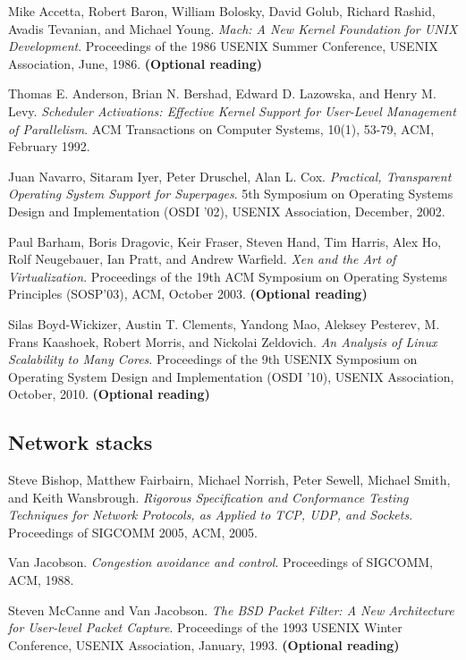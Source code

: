 \documentclass[a4paper,10pt]{article}
\begin{document}
Mike Accetta, Robert Baron, William Bolosky, David Golub, Richard Rashid,
Avadis Tevanian, and Michael Young. \textit{Mach: A New Kernel Foundation for
UNIX Development}.  Proceedings of the 1986 USENIX Summer Conference, USENIX
Association, June, 1986.  \textbf{(Optional reading)}

\medskip
\noindent
Thomas E. Anderson, Brian N. Bershad, Edward D. Lazowska, and Henry M. Levy.
\textit{Scheduler Activations: Effective Kernel Support for User-Level
Management of Parallelism}. ACM Transactions on Computer Systems, 10(1),
53-79, ACM, February 1992.

\medskip
\noindent
Juan Navarro, Sitaram Iyer, Peter Druschel, Alan L. Cox.  \textit{Practical,
Transparent Operating System Support for Superpages}.  5th Symposium on
Operating Systems Design and Implementation (OSDI '02), USENIX Association,
December, 2002.

\medskip
\noindent
Paul Barham, Boris Dragovic, Keir Fraser, Steven Hand, Tim Harris, Alex Ho,
Rolf Neugebauer, Ian Pratt, and Andrew Warfield.  \textit{Xen and the Art of
Virtualization}. Proceedings of the 19th ACM Symposium on Operating Systems
Principles (SOSP'03), ACM, October 2003.  \textbf{(Optional reading)}

\medskip
\noindent
Silas Boyd-Wickizer, Austin T. Clements, Yandong Mao, Aleksey Pesterev, M.
Frans Kaashoek, Robert Morris, and Nickolai Zeldovich.  \textit{An Analysis of
Linux Scalability to Many Cores}.  Proceedings of the 9th USENIX Symposium on
Operating System Design and Implementation (OSDI '10), USENIX Association,
October, 2010.  \textbf{(Optional reading)}

\subsection*{Network stacks}

Steve Bishop, Matthew Fairbairn, Michael Norrish, Peter Sewell, Michael Smith,
and Keith Wansbrough.  \textit{Rigorous Specification and Conformance Testing
Techniques for Network Protocols, as Applied to TCP, UDP, and Sockets}.
Proceedings of SIGCOMM 2005, ACM, 2005.

\medskip
\noindent
Van Jacobson.  \textit{Congestion avoidance and control}.  Proceedings of
SIGCOMM, ACM, 1988.

\medskip
\noindent
Steven McCanne and Van Jacobson.  \textit{The BSD Packet Filter: A New
Architecture for User-level Packet Capture}.  Proceedings of the 1993 USENIX
Winter Conference, USENIX Association, January, 1993.  \textbf{(Optional
reading)}
\end{document}
